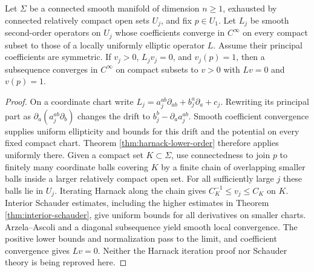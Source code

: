 \begin{lemma}\label{lem:normalized-positive-solutions}
Let $\Sigma$ be a connected smooth manifold of dimension $n\geq1$, exhausted by connected relatively compact open sets $U_j$, and fix $p\in U_1$. Let $L_j$ be smooth second-order operators on $U_j$ whose coefficients converge in $C^\infty$ on every compact subset to those of a locally uniformly elliptic operator $L$. Assume their principal coefficients are symmetric. If $v_j>0$, $L_jv_j=0$, and $v_j(p)=1$, then a subsequence converges in $C^\infty$ on compact subsets to $v>0$ with $Lv=0$ and $v(p)=1$.
\end{lemma}
\begin{proof}
On a coordinate chart write $L_j=a_j^{ab}\partial_{ab}+b_j^a\partial_a+c_j$. Rewriting its principal part as $\partial_a(a_j^{ab}\partial_b)$ changes the drift to $b_j^b-\partial_a a_j^{ab}$. Smooth coefficient convergence supplies uniform ellipticity and bounds for this drift and the potential on every fixed compact chart. Theorem \ref{thm:harnack-lower-order} therefore applies uniformly there.
Given a compact set $K\subset\Sigma$, use connectedness to join $p$ to finitely many coordinate balls covering $K$ by a finite chain of overlapping smaller balls inside a larger relatively compact open set. For all sufficiently large $j$ these balls lie in $U_j$. Iterating Harnack along the chain gives $C_K^{-1}\leq v_j\leq C_K$ on $K$. Interior Schauder estimates, including the higher estimates in Theorem \ref{thm:interior-schauder}, give uniform bounds for all derivatives on smaller charts. Arzela--Ascoli and a diagonal subsequence yield smooth local convergence. The positive lower bounds and normalization pass to the limit, and coefficient convergence gives $Lv=0$. Neither the Harnack iteration proof nor Schauder theory is being reproved here.
\end{proof}

